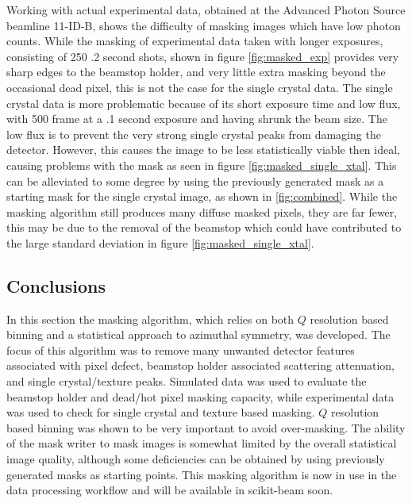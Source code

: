 Working with actual experimental data, obtained at the Advanced Photon Source beamline 11-ID-B, shows the difficulty of masking images which have low photon counts.
While the masking of experimental data taken with longer exposures, consisting of 250 .2 second shots, shown in figure \ref{fig:masked_exp} provides very sharp edges to the beamstop holder, and very little extra masking beyond the occasional dead pixel, this is not the case for the single crystal data.
The single crystal data is more problematic because of its short exposure time and low flux, with 500 frame at a .1 second exposure and having shrunk the beam size.
The low flux is to prevent the very strong single crystal peaks from damaging the detector.
However, this causes the image to be less statistically viable then ideal, causing problems with the mask as seen in figure \ref{fig:masked_single_xtal}.
This can be alleviated to some degree by using the previously generated mask as a starting mask for the single crystal image, as shown in \ref{fig:combined}.
While the masking algorithm still produces many diffuse masked pixels, they are far fewer, this may be due to the removal of the beamstop which could have contributed to the large standard deviation in figure \ref{fig:masked_single_xtal}.


\subsection{Conclusions}
In this section the masking algorithm, which relies on both $Q$ resolution based binning and a statistical approach to azimuthal symmetry, was developed.
The focus of this algorithm was to remove many unwanted detector features associated with pixel defect, beamstop holder associated scattering attenuation, and single crystal/texture peaks.
Simulated data was used to evaluate the beamstop holder and dead/hot pixel masking capacity, while experimental data was used to check for single crystal and texture based masking.
$Q$ resolution based binning was shown to be very important to avoid over-masking.
The ability of the mask writer to mask images is somewhat limited by the overall statistical image quality, although some deficiencies can be obtained by using previously generated masks as starting points.
This masking algorithm is now in use in the data processing workflow and will be available in scikit-beam soon.
